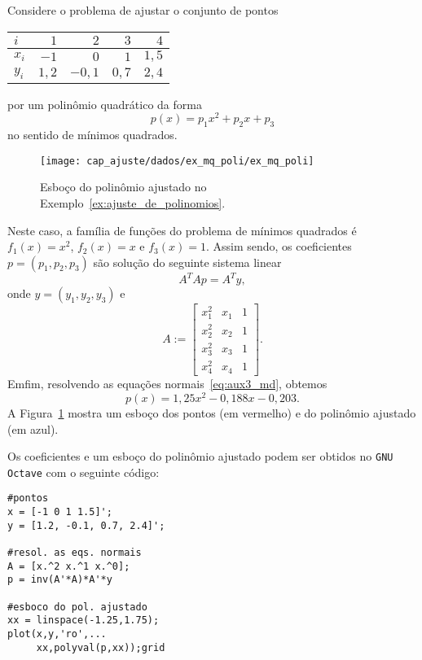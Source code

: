 \begin{ex}\label{ex:ajuste_de_polinomios}
  Considere o problema de ajustar o conjunto de pontos
  \begin{center}
    \begin{tabular}{l|rrrr}
      $i$ & $1$ & $2$ & $3$ & $4$ \\\hline
      $x_i$ & $-1$ & $0$ & $1$ & $1,5$\\
      $y_i$ & $1,2$ & $-0,1$ & $0,7$ & $2,4$\\\hline
    \end{tabular}
  \end{center}
  por um polinômio quadrático da forma
  \begin{equation}
    p(x) = p_1x^2 + p_2x + p_3
  \end{equation}
  no sentido de mínimos quadrados.  

  \begin{figure}[h]
    \centering
    \texttt{[image: cap\_ajuste/dados/ex\_mq\_poli/ex\_mq\_poli]}
    \caption{Esboço do polinômio ajustado no Exemplo~\ref{ex:ajuste_de_polinomios}.}
    \label{fig:ex_mq_poli}
  \end{figure}
  
  
  Neste caso, a família de funções do problema de mínimos quadrados é $f_1(x) = x^2$, $f_2(x) = x$ e $f_3(x) = 1$. Assim sendo, os coeficientes $p = (p_1, p_2, p_3)$ são solução do seguinte sistema linear
  \begin{equation}\label{eq:aux3_md}
    A^TAp = A^Ty,
  \end{equation}
  onde $y = (y_1, y_2, y_3)$ e
  \begin{equation}
    A :=
    \begin{bmatrix}
      x_1^2 & x_1 & 1 \\
      x_2^2 & x_2 & 1 \\
      x_3^2 & x_3 & 1 \\
      x_4^2 & x_4 & 1
    \end{bmatrix}.
  \end{equation}
  Emfim, resolvendo as equações normais~\eqref{eq:aux3_md}, obtemos
  \begin{equation}
    p(x) = 1,25x^2 -0,188x - 0,203.
  \end{equation}
  A Figura~\ref{fig:ex_mq_poli} mostra um esboço dos pontos (em vermelho) e do polinômio ajustado (em azul).
  
  \ifisoctave
  Os coeficientes e um esboço do polinômio ajustado podem ser obtidos no \verb+GNU Octave+ com o seguinte código:
\begin{verbatim}
#pontos
x = [-1 0 1 1.5]';
y = [1.2, -0.1, 0.7, 2.4]';

#resol. as eqs. normais
A = [x.^2 x.^1 x.^0];
p = inv(A'*A)*A'*y

#esboco do pol. ajustado
xx = linspace(-1.25,1.75);
plot(x,y,'ro',...
     xx,polyval(p,xx));grid
\end{verbatim}
  \fi
  
\end{ex}


